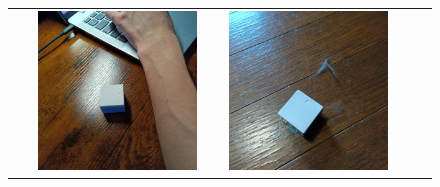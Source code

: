 \documentclass[paper=a4paper,jafontsize=9pt,head_space=15mm,gutter=20mm,
twocolumn,number_of_lines=49, line_length=26zw]{myuarticle}
\begin{document}
\begin{figure}[t]
\begin{tabular}{|c|c|c|c|c|}
\begin{minipage}[c]{0.15\textwidth}
    \end{minipage}    &
    \begin{minipage}[c]{0.15\textwidth}
      \centering
      \includegraphics[width=0.9\textwidth]{resources/pet_before.jpg}
    \end{minipage}    &
    \begin{minipage}[c]{0.15\textwidth}
      \centering
      \includegraphics[width=0.9\textwidth]{resources/vacuum_before.jpg}

\end{minipage}
\end{tabular}
\end{figure}
\end{document}
